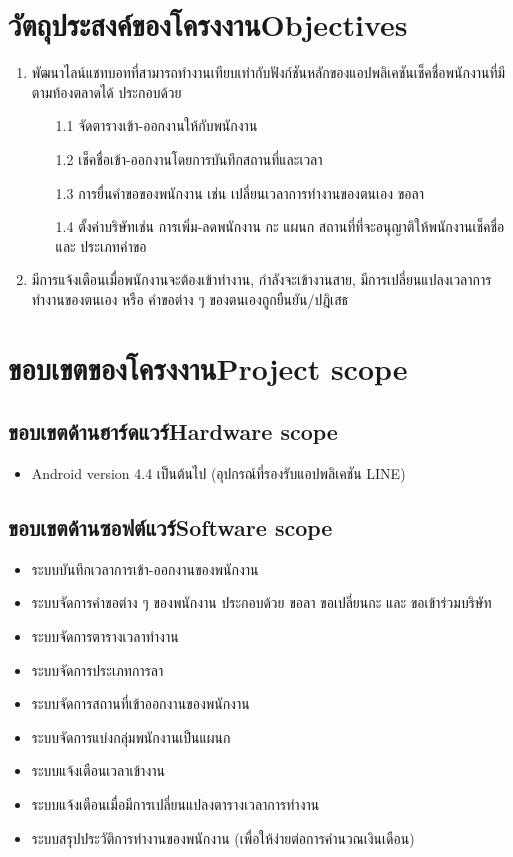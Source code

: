 \section{\ifcpe วัตถุประสงค์ของโครงงาน\else Objectives\fi}
\begin{enumerate}
    \item พัฒนาไลน์แชทบอทที่สามารถทำงานเทียบเท่ากับฟังก์ชันหลักของแอปพลิเคชันเช็คชื่อพนักงานที่มีตามท้องตลาดได้ ประกอบด้วย 
    \begin{enumerate}
    \item[1.1] จัดตารางเข้า-ออกงานให้กับพนักงาน
    \item[1.2] เช็คชื่อเข้า-ออกงานโดยการบันทึกสถานที่และเวลา
    \item[1.3] การยื่นคำขอของพนักงาน เช่น เปลี่ยนเวลาการทำงานของตนเอง ขอลา
    \item[1.4] ตั้งค่าบริษัทเช่น การเพิ่ม-ลดพนักงาน กะ แผนก สถานที่ที่จะอนุญาติให้พนักงานเช็คชื่อ และ ประเภทคำขอ
    \end{enumerate} 
    \item มีการแจ้งเตือนเมื่อพนักงานจะต้องเข้าทำงาน, กำลังจะเข้างานสาย, มีการเปลี่ยนแปลงเวลาการทำงานของตนเอง หรือ คำขอต่าง ๆ ของตนเองถูกยืนยัน/ปฎิเสธ
\end{enumerate}

\section{\ifcpe ขอบเขตของโครงงาน\else Project scope\fi}

\subsection{\ifcpe ขอบเขตด้านฮาร์ดแวร์\else Hardware scope\fi}
\begin{itemize}
    \item Android version 4.4 เป็นต้นไป (อุปกรณ์ที่รองรับแอปพลิเคชัน LINE)
\end{itemize}

\subsection{\ifcpe ขอบเขตด้านซอฟต์แวร์\else Software scope\fi}
\begin{itemize}
    \item ระบบบันทึกเวลาการเข้า-ออกงานของพนักงาน
    \item ระบบจัดการคำขอต่าง ๆ ของพนักงาน ประกอบด้วย ขอลา ขอเปลี่ยนกะ และ ขอเข้าร่วมบริษัท
    \item ระบบจัดการตารางเวลาทำงาน 
    \item ระบบจัดการประเภทการลา
    \item ระบบจัดการสถานที่เข้าออกงานของพนักงาน
    \item ระบบจัดการแบ่งกลุ่มพนักงานเป็นแผนก
    \item ระบบแจ้งเตือนเวลาเข้างาน
    \item ระบบแจ้งเตือนเมื่อมีการเปลี่ยนแปลงตารางเวลาการทำงาน
    \item ระบบสรุปประวัติการทำงานของพนักงาน (เพื่อให้ง่ายต่อการคำนวณเงินเดือน)
\end{itemize}

